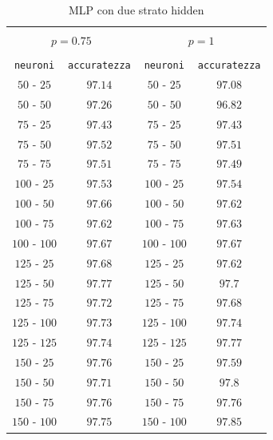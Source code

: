 \documentclass[11pt,a4paper,twoside,
openright]{book}
\begin{document}
\vspace*{\fill}
\begin{center}

\begin{table}[]
  \small
  \caption{MLP con due strato hidden}\label{tab:tab1}
\begin{center}
\begin{tabular}{@{}cc|cc@{}}

\hline\\[-11pt]
\hline\\[-6.5pt]
\multicolumn{2}{c}{\bf $p=0.75$} & \multicolumn{2}{c}{\bf $p=1$ } \\[5pt]
\hline\\[-11pt]
\texttt{neuroni} & \texttt{accuratezza} & \texttt{neuroni} & \texttt{accuratezza} \\[1pt]
$50$ - $25$ & $97.14$ & $50$ - $25$ & $97.08$ \\ [1pt]
$50$ - $50$ & $97.26$ & $50$ - $50$ & $96.82$ \\ [1pt]
$75$ - $25$ & $97.43$ & $75$ - $25$ & $97.43$ \\ [1pt]
$75$ - $50$ & $97.52$ & $75$ - $50$ & $97.51$ \\ [1pt]
$75$ - $75$ & $97.51$ & $75$ - $75$ & $97.49$ \\ [1pt]
$100$ - $25$ & $97.53$  &  $100$ - $25$ & $97.54$ \\ [1pt]
$100$ - $50$ & $97.66$  &  $100$ - $50$ & $97.62$ \\ [1pt]
$100$ - $75$ & $97.62$  &  $100$ - $75$ & $97.63$ \\ [1pt]
$100$ - $100$ & $97.67$  & $100$ - $100$ & $97.67$ \\ [1pt]
$125$ - $25$ & $97.68$  &  $125$ - $25$ & $97.62$ \\ [1pt]
$125$ - $50$ & $97.77$ &  $125$ - $50$ & $97.7$ \\ [1pt]
$125$ - $75$ & $97.72$  &  $125$ - $75$ & $97.68$ \\ [1pt]
$125$ - $100$ & $97.73$  & $125$ - $100$ & $97.74$ \\ [1pt]
$125$ - $125$ & $97.74$  & $125$ - $125$ & $97.77$ \\ [1pt]
$150$ - $25$ & $97.76$  &  $150$ - $25$ & $97.59$ \\ [1pt]
$150$ - $50$ & $97.71$ &  $150$ - $50$ & $97.8$ \\ [1pt]
$150$ - $75$ & $97.76$  &  $150$ - $75$ & $97.76$ \\ [1pt]
$150$ - $100$ & $97.75$  & $150$ - $100$ & $97.85$ \\ [1pt]

\end{tabular}
\end{center}
\end{table}
\end{center}
\end{document}
